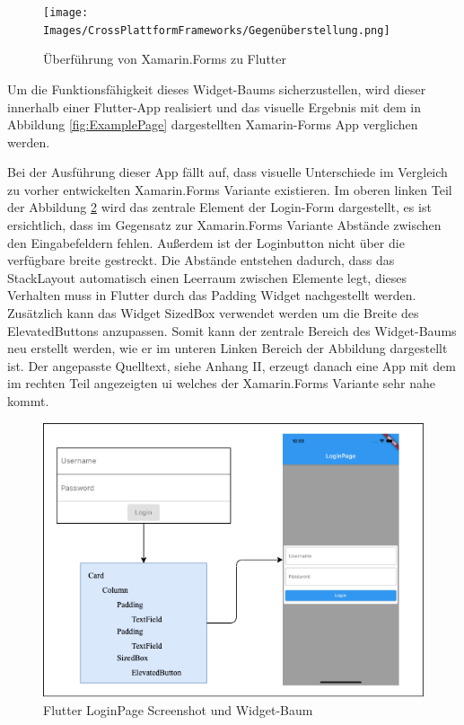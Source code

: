 \begin{figure}[!ht]
 \texttt{[image: Images/CrossPlattformFrameworks/Gegenüberstellung.png]}
 \caption{Überführung von Xamarin.Forms zu Flutter}
 \label{fig:LayoutTrees}
\end{figure}

Um die Funktionsfähigkeit dieses Widget-Baums sicherzustellen,  wird dieser innerhalb einer Flutter-App realisiert und das visuelle Ergebnis mit dem in Abbildung  \ref{fig:ExamplePage} dargestellten Xamarin-Forms App verglichen werden. 

 

Bei der Ausführung dieser App fällt auf,  dass visuelle Unterschiede im Vergleich zu vorher entwickelten Xamarin.Forms Variante existieren.  Im oberen linken Teil der Abbildung \ref{fig:LoginPageFlutter} wird das zentrale Element der Login-Form dargestellt, es ist ersichtlich, dass im Gegensatz zur Xamarin.Forms Variante Abstände zwischen den Eingabefeldern fehlen.  Außerdem ist der Loginbutton nicht über die verfügbare breite gestreckt.  Die Abstände entstehen dadurch, dass das StackLayout automatisch einen Leerraum zwischen Elemente legt, dieses Verhalten muss in Flutter durch das Padding Widget nachgestellt werden.  Zusätzlich kann das Widget SizedBox verwendet werden um die Breite des ElevatedButtons anzupassen.  Somit kann der zentrale Bereich des Widget-Baums neu erstellt werden,  wie er im unteren Linken Bereich der Abbildung dargestellt ist.  Der angepasste Quelltext,  siehe Anhang II,  erzeugt danach eine App mit dem im rechten Teil angezeigten \ac{ui} welches der Xamarin.Forms Variante sehr nahe kommt.

\begin{figure}[!ht]
 \includegraphics[width=\textwidth,height=\textheight,keepaspectratio]{Images/CrossPlattformFrameworks/FlutterLoginPage.png}
 \caption{Flutter LoginPage Screenshot und Widget-Baum}
 \label{fig:LoginPageFlutter}
\end{figure}

